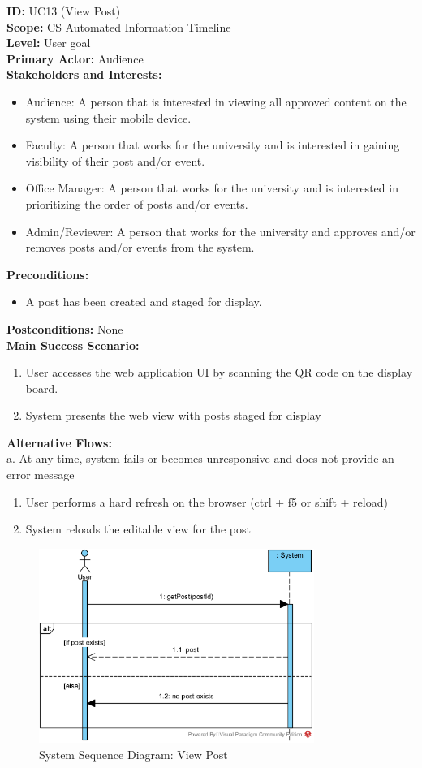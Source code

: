 \textbf{ID:} UC13 (View Post) \\
\textbf{Scope:} CS Automated Information Timeline \\
\textbf{Level:} User goal \\
\textbf{Primary Actor:} Audience \\
\textbf{Stakeholders and Interests: }
\begin{itemize}
    \item Audience: A person that is interested in viewing all approved content on the system using their mobile device.
    \item Faculty: A person that works for the university and is interested in gaining visibility of their post and/or event.
    \item Office Manager: A person that works for the university and is interested in prioritizing the order of posts and/or events.
    \item Admin/Reviewer: A person that works for the university and approves and/or removes posts and/or events from the system.
\end{itemize}
\textbf{Preconditions: }
\begin{itemize}
    \item A post has been created and staged for display.
\end{itemize}
\textbf{Postconditions:} None \\
\textbf{Main Success Scenario: }
\begin{enumerate}
    \item User accesses the web application UI by scanning the QR code on the display board.
    \item System presents the web view with posts staged for display
\end{enumerate}
\textbf{Alternative Flows: } \\
a. At any time, system fails or becomes unresponsive and does not provide an error message
\begin{enumerate}
    \item User performs a hard refresh on the browser (ctrl + f5 or shift + reload)
    \item System reloads the editable view for the post
\end{enumerate}

\begin{figure}[H]
    \centering
    \includegraphics[width=0.8\textwidth]{images/SSD-UC13-ViewPost.png}
    \centering
    \caption{System Sequence Diagram: View Post}
\end{figure}


